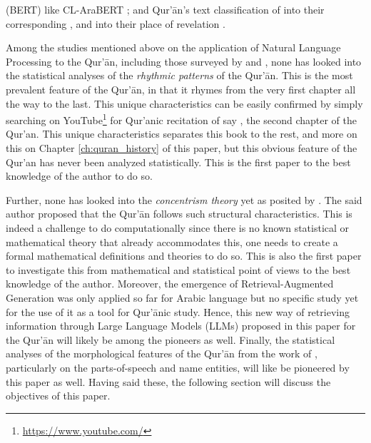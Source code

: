(BERT) like CL-AraBERT ; and Qur'\=an's text classification of   into their corresponding   , and into their place of revelation .

Among the studies mentioned above on the application of Natural Language Processing to the Qur'\=an, including those surveyed by  and , none has looked into the statistical analyses of the \textit{rhythmic patterns} of the Qur'\=an. This is the most prevalent feature of the Qur'\=an, in that it rhymes from the very first chapter all the way to the last. This unique characteristics can be easily confirmed by simply searching on YouTube\footnote{\url{https://www.youtube.com/}} for Qur'anic recitation of say  , the second chapter of the Qur'an. This unique characteristics separates this book to the rest, and more on this on Chapter \ref{ch:quran_history} of this paper, but this obvious feature of the Qur'an has never been analyzed statistically. This is the first paper to the best knowledge of the author to do so. 

Further, none has looked into the \textit{concentrism theory} yet as posited by . The said author proposed that the Qur'\=an follows such structural characteristics. This is indeed a challenge to do computationally since there is no known statistical or mathematical theory that already accommodates this, one needs to create a formal mathematical definitions and theories to do so. This is also the first paper to investigate this from mathematical and statistical point of views to the best knowledge of the author. Moreover, the emergence of Retrieval-Augmented Generation was only applied so far for Arabic language  but no specific study yet for the use of it as a tool for Qur'\=anic study. Hence, this new way of retrieving information through Large Language Models (LLMs) proposed in this paper for the Qur'\=an will likely be among the pioneers as well. Finally, the statistical analyses of the morphological features of the Qur'\=an from the work of , particularly on the parts-of-speech and name entities, will like be pioneered by this paper as well. Having said these, the following section will discuss the objectives of this paper.

